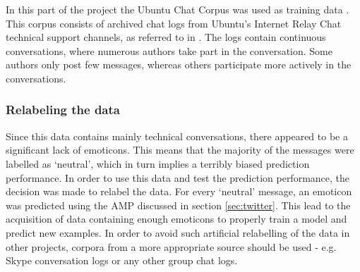 In this part of the project the Ubuntu Chat Corpus was used as training data \cite{ubuntudata}. This corpus consists of archived chat logs from Ubuntu's Internet Relay Chat technical support channels, as referred to in \cite{ubuntudata}. The logs contain continuous conversations, where numerous authors take part in the conversation. Some authors only post few messages, whereas others participate more actively in the conversations. 

\subsubsection*{Relabeling the data} 
Since this data contains mainly technical conversations, there appeared to be a significant lack of emoticons. This means that the majority of the messages were labelled as `neutral', which in turn implies a terribly biased prediction performance. In order to use this data and test the prediction performance, the decision was made to relabel the data. For every `neutral' message, an emoticon was predicted using the AMP discussed in section \ref{sec:twitter}. This lead to the acquisition of data containing enough emoticons to properly train a model and predict new examples. In order to avoid such artificial relabelling of the data in other projects, corpora from a more appropriate source should be used - e.g. Skype conversation logs or any other group chat logs.
